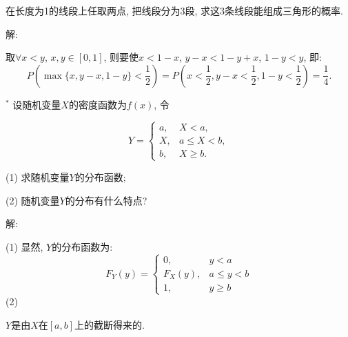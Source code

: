 \documentclass[standard]{ExBook}
\begin{document}
\begin{qitems}
\vspace{-5em}

    \begin{bbox}
    \begin{shaded}
        \qitem
在长度为1的线段上任取两点, 把线段分为3段, 求这3条线段能组成三角形的概率.
    \end{shaded}
    \end{bbox}

\vspace{-5em}

    \begin{bbox}
解: 

取$\forall x<y$, $x,y\in[0,1]$, 则要使$x<1-x$, $y-x<1-y+x$, $1-y<y$, 即:
$$P(\max\{x,y-x,1-y\}<\frac{1}{2})=P(x<\frac{1}{2},y-x<\frac{1}{2},1-y<\frac{1}{2})=\frac{1}{4}.$$
    \end{bbox}

\vspace{-5em}

    \begin{bbox}
    \begin{shaded}
        \qitem$^{*}$
设随机变量$X$的密度函数为$f(x)$, 令
\vspace{-2em}
\begin{center}
\begin{equation}
    Y=
    \left\{
    \begin{array}{cl}
        \nonumber
        a, &X<a,\\
        X, &a\leq X<b,\\
        b, &X\geq b.
    \end{array}
    \right.
\end{equation}
\end{center}
(1) 求随机变量$Y$的分布函数;

(2) 随机变量$Y$的分布有什么特点?
    \end{shaded}
    \end{bbox}

\vspace{-5em}

    \begin{bbox}
解: 

(1) 显然, $Y$的分布函数为:
\[
F_Y(y) =
\begin{cases}
0, & y < a \\
F_X(y), & a \leq y < b \\
1, & y \geq b
\end{cases}
\]
(2) 

 $Y$是由$X$在$[a,b]$上的截断得来的.


\end{bbox}
\end{qitems}
\end{document}
